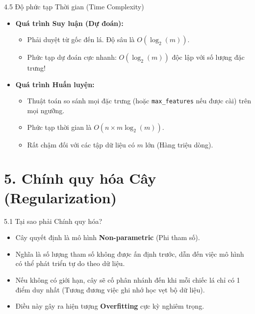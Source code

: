 \documentclass[aspectratio=169, 12pt]{beamer}
\begin{document}
\begin{frame}{4.5 Độ phức tạp Thời gian (Time Complexity)}
    \begin{itemize}
        \item \textbf{Quá trình Suy luận (Dự đoán):}
        \begin{itemize}
            \item Phải duyệt từ gốc đến lá. Độ sâu là $O(\log_2(m))$.
            \item Phức tạp dự đoán cực nhanh: $O(\log_2(m))$ độc lập với số lượng đặc trưng!
        \end{itemize}
        \item \textbf{Quá trình Huấn luyện:}
        \begin{itemize}
            \item Thuật toán so sánh mọi đặc trưng (hoặc \texttt{max\_features} nếu được cài) trên mọi ngưỡng.
            \item Phức tạp thời gian là $O(n \times m \log_2(m))$.
            \item Rất chậm đối với các tập dữ liệu có $m$ lớn (Hàng triệu dòng).
        \end{itemize}
    \end{itemize}
\end{frame}


\section{5. Chính quy hóa Cây (Regularization)}

\begin{frame}{5.1 Tại sao phải Chính quy hóa?}
    \begin{itemize}
        \item Cây quyết định là mô hình \textbf{Non-parametric} (Phi tham số).
        \item Nghĩa là số lượng tham số không được ấn định trước, dẫn đến việc mô hình có thể phát triển tự do theo dữ liệu.
        \item Nếu không có giới hạn, cây sẽ cố phân nhánh đến khi mỗi chiếc lá chỉ có 1 điểm duy nhất (Tương đương việc ghi nhớ học vẹt bộ dữ liệu).
        \item Điều này gây ra hiện tượng \textbf{Overfitting} cực kỳ nghiêm trọng.
    \end{itemize}
\end{frame}
\end{document}
